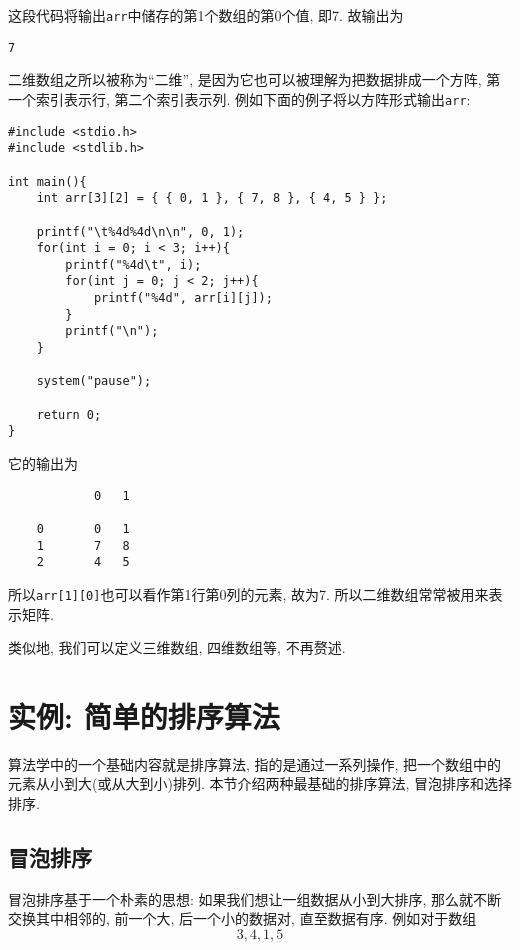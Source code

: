         这段代码将输出\texttt{arr}中储存的第1个数组的第0个值, 即7. 故输出为
\begin{lstlisting}
7
\end{lstlisting}

        二维数组之所以被称为``二维'', 是因为它也可以被理解为把数据排成一个方阵, 第一个索引表示行, 第二个索引表示列. 例如下面的例子将以方阵形式输出\texttt{arr}:
\begin{lstlisting}
#include <stdio.h>
#include <stdlib.h>

int main(){
    int arr[3][2] = { { 0, 1 }, { 7, 8 }, { 4, 5 } };

    printf("\t%4d%4d\n\n", 0, 1);
    for(int i = 0; i < 3; i++){
        printf("%4d\t", i);
        for(int j = 0; j < 2; j++){
            printf("%4d", arr[i][j]);
        }
        printf("\n");
    }

    system("pause");

    return 0;
}
\end{lstlisting}

        它的输出为
\begin{lstlisting}
            0   1

    0       0   1
    1       7   8
    2       4   5
\end{lstlisting}

        所以\texttt{arr[1][0]}也可以看作第1行第0列的元素, 故为7. 所以二维数组常常被用来表示矩阵. 

        类似地, 我们可以定义三维数组, 四维数组等, 不再赘述.

    \section{实例: 简单的排序算法} \label{简单的排序算法}
        算法学中的一个基础内容就是排序算法, 指的是通过一系列操作, 把一个数组中的元素从小到大(或从大到小)排列. 本节介绍两种最基础的排序算法, 冒泡排序和选择排序.

        \subsection*{冒泡排序}
            冒泡排序基于一个朴素的思想: 如果我们想让一组数据从小到大排序, 那么就不断交换其中相邻的, 前一个大, 后一个小的数据对, 直至数据有序. 例如对于数组
                \[ 3, 4, 1, 5 \]

